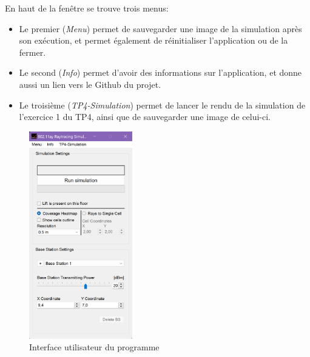 En haut de la fenêtre se trouve trois menus:
\begin{itemize}
    \item Le premier (\textit{Menu}) permet de sauvegarder une image de la simulation après son exécution, et permet également de réinitialiser l'application ou de la fermer.
    \item Le second (\textit{Info}) permet d'avoir des informations sur l'application, et donne aussi un lien vers le Github du projet.
    \item Le troisième (\textit{TP4-Simulation}) permet de lancer le rendu de la simulation de l'exercice 1 du TP4, ainsi que de sauvegarder une image de celui-ci.
\end{itemize}

\begin{figure}[H]
    \centering
    \includegraphics[width=0.4\textwidth]{latex/images/interface.png}
    \caption{Interface utilisateur du programme}
    \label{fig:interface}
\end{figure}

